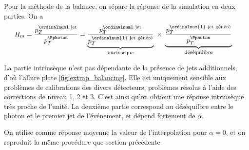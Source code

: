 Pour la méthode de la balance, on sépare la réponse de la simulation en deux parties. On a
\begin{align*}
  R_m &= \frac{\ptfjet}{\ptg} = \underbrace{ \frac{\ptfjet}{p_T^{\text{\ordinalnum{1} jet généré}}} }_{\text{intrinsèque}} \; \times \; \underbrace{ \frac{p_T^{\text{\ordinalnum{1} jet généré}}}{\ptg} }_{\text{déséquilibre}}
\end{align*}

La partie intrinsèque n'est pas dépendante de la présence de jets additionnels, d'où l'allure plate \cref{fig:extrap_balancing}. Elle est uniquement sensible aux problèmes de calibrations des divers détecteurs, problèmes résolus à l'aide des corrections de niveau 1, 2 et 3. C'est ainsi qu'on obtient une réponse intrinsèque très proche de l'unité. La deuxième partie correspond au déséquilbre entre le photon et le premier jet de l'événement, et dépend fortement de $\alpha$.

On utilise comme réponse moyenne la valeur de l'interpolation pour $\alpha = 0$, et on reproduit la même procédure que section précédente.

